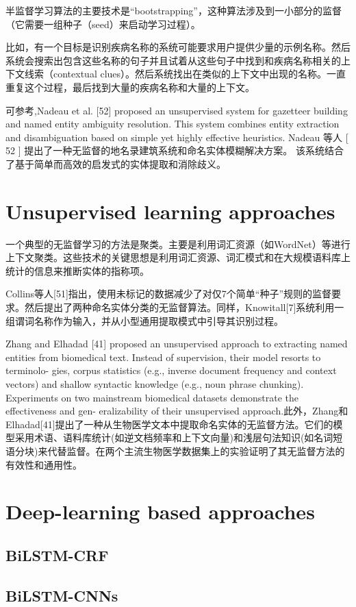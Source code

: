 \documentclass[a4paper,UTF8,no-math]{ctexart}
\begin{document}
	半监督学习算法的主要技术是“bootstrapping”，这种算法涉及到一小部分的监督（它需要一组种子（seed）来启动学习过程）。
	
	比如，有一个目标是识别疾病名称的系统可能要求用户提供少量的示例名称。然后系统会搜索出包含这些名称的句子并且试着从这些句子中找到和疾病名称相关的上下文线索（contextual clues）。然后系统找出在类似的上下文中出现的名称。一直重复这个过程，最后找到大量的疾病名称和大量的上下文。
	
	可参考\citep{nadeau2006unsupervised},Nadeau et al. [52] proposed an unsupervised system for
	gazetteer building and named entity ambiguity resolution.
	This system combines entity extraction and disambiguation
	based on simple yet highly effective heuristics.
	Nadeau 等人 [ 52 ] 提出了一种无监督的地名录建筑系统和命名实体模糊解决方案。 该系统结合了基于简单而高效的启发式的实体提取和消除歧义。
	
	
	
	\section{Unsupervised learning approaches}
	
	一个典型的无监督学习的方法是聚类。主要是利用词汇资源（如WordNet）等进行上下文聚类。这些技术的关键思想是利用词汇资源、词汇模式和在大规模语料库上统计的信息来推断实体的指称项。
	
	Collins等人[51]指出，使用未标记的数据减少了对仅7个简单“种子”规则的监督要求。然后提出了两种命名实体分类的无监督算法。同样，Knowitall[7]系统利用一组谓词名称作为输入，并从小型通用提取模式中引导其识别过程。 
	
	 Zhang and Elhadad [41] proposed an unsupervised
	approach to extracting named entities from biomedical text.
	Instead of supervision, their model resorts to terminolo-
	gies, corpus statistics (e.g., inverse document frequency
	and context vectors) and shallow syntactic knowledge (e.g.,
	noun phrase chunking). Experiments on two mainstream
	biomedical datasets demonstrate the effectiveness and gen-
	eralizability of their unsupervised approach.此外，Zhang和Elhadad[41]提出了一种从生物医学文本中提取命名实体的无监督方法。它们的模型采用术语、语料库统计(如逆文档频率和上下文向量)和浅层句法知识(如名词短语分块)来代替监督。在两个主流生物医学数据集上的实验证明了其无监督方法的有效性和通用性。 
	
	
	
	
	
	
	
	
	\section{Deep-learning based approaches}
	
	\subsection{BiLSTM-CRF}
	\subsection{BiLSTM-CNNs}

    
\end{document}
